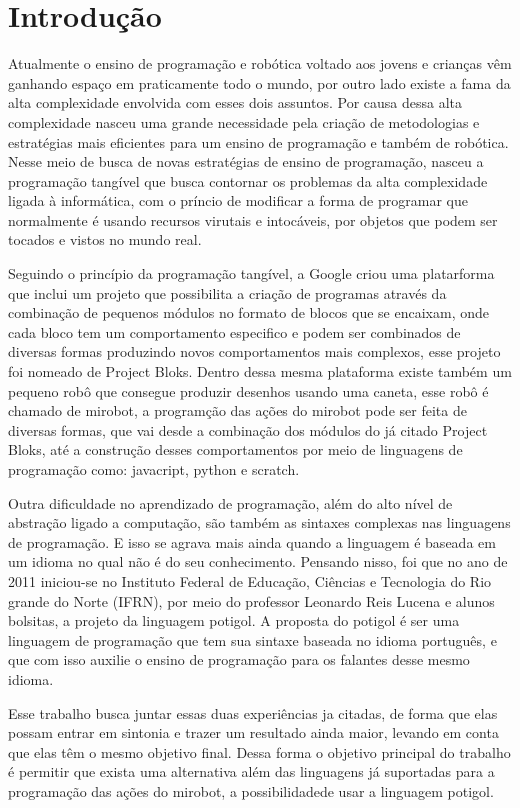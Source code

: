 \chapter{Introdução}
\label{cap:introducao}

Atualmente o ensino de programação e robótica voltado aos jovens e crianças vêm
ganhando espaço em praticamente todo o mundo, por outro lado existe a fama da
alta complexidade envolvida com esses dois assuntos. Por causa dessa alta
complexidade nasceu uma grande necessidade pela criação de metodologias e
estratégias mais eficientes para um ensino de programação e também de robótica.
Nesse meio de busca de novas estratégias de ensino de programação, nasceu a
programação tangível que busca contornar os problemas da alta complexidade
ligada à informática, com o príncio de modificar a forma de programar que
normalmente é usando recursos virutais e intocáveis, por objetos que podem ser
tocados e vistos no mundo real.

Seguindo o princípio da programação tangível, a Google criou uma platarforma
que inclui um projeto que possibilita a criação de programas através da
combinação de pequenos módulos no formato de blocos que se encaixam, onde cada
bloco tem um comportamento especifico e podem ser combinados de diversas formas
produzindo novos comportamentos mais complexos, esse projeto foi nomeado de
Project Bloks. Dentro dessa mesma plataforma existe também um pequeno robô que
consegue produzir desenhos usando uma caneta, esse robô é chamado de mirobot, a
programção das ações do mirobot pode ser feita de diversas formas, que vai
desde a combinação dos módulos do já citado Project Bloks, até a construção
desses comportamentos por meio de linguagens de programação como: javacript,
python e scratch.

Outra dificuldade no aprendizado de programação, além do alto nível de
abstração ligado a computação, são também as sintaxes complexas nas linguagens
de programação. E isso se agrava mais ainda quando a linguagem é baseada em um
idioma no qual não é do seu conhecimento. Pensando nisso, foi que no ano de
2011 iniciou-se no Instituto Federal de Educação, Ciências e Tecnologia do Rio
grande do Norte (IFRN), por meio do professor Leonardo Reis Lucena e alunos
bolsitas, a projeto da linguagem potigol. A proposta do potigol é ser uma
linguagem de programação que tem sua sintaxe baseada no idioma português, e que
com isso auxilie o ensino de programação para os falantes desse mesmo idioma.

Esse trabalho busca juntar essas duas experiências ja citadas, de forma que
elas possam entrar em sintonia e trazer um resultado ainda maior, levando em
conta que elas têm o mesmo objetivo final. Dessa forma o objetivo principal do
trabalho é permitir que exista uma alternativa além das linguagens já
suportadas para a programação das ações do mirobot, a possibilidadede usar a
linguagem potigol.

